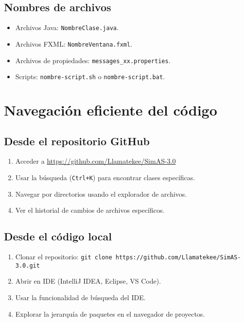 \subsection{Nombres de archivos}

\begin{itemize}
    \item Archivos Java: \texttt{NombreClase.java}.
    \item Archivos FXML: \texttt{NombreVentana.fxml}.
    \item Archivos de propiedades: \texttt{messages\_xx.properties}.
    \item Scripts: \texttt{nombre-script.sh} o \texttt{nombre-script.bat}.
\end{itemize}

\section{Navegación eficiente del código}

\subsection{Desde el repositorio GitHub}

\begin{enumerate}
    \item Acceder a \url{https://github.com/Llamatekee/SimAS-3.0}
    \item Usar la búsqueda (\texttt{Ctrl+K}) para encontrar clases específicas.
    \item Navegar por directorios usando el explorador de archivos.
    \item Ver el historial de cambios de archivos específicos.
\end{enumerate}

\subsection{Desde el código local}

\begin{enumerate}
    \item Clonar el repositorio: \texttt{git clone https://github.com/Llamatekee/SimAS-3.0.git}
    \item Abrir en IDE (IntelliJ IDEA, Eclipse, VS Code).
    \item Usar la funcionalidad de búsqueda del IDE.
    \item Explorar la jerarquía de paquetes en el navegador de proyectos.
\end{enumerate}

